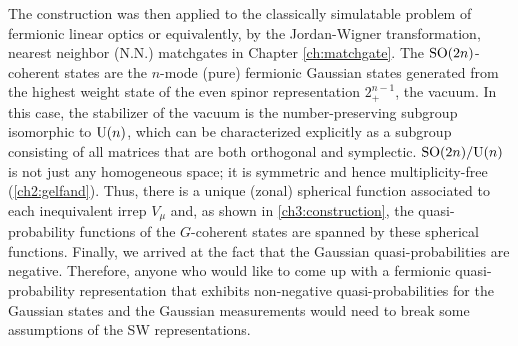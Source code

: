 The construction was then applied to the classically simulatable problem of fermionic linear optics or equivalently, by the Jordan-Wigner transformation, nearest neighbor (N.N.) matchgates in Chapter \ref{ch:matchgate}. The $\text{SO}(2n)$-coherent states are the $n$-mode (pure) fer\-mi\-on\-ic Gaussian states generated from the highest weight state of the even spinor representation $2^{n-1}_+$, the vacuum. In this case, the stabilizer of the vacuum is the number-preserving subgroup isomorphic to $\text{U}(n)$, which can be characterized explicitly as a subgroup consisting of all matrices that are both orthogonal and symplectic. $\text{SO}(2n)/\text{U}(n)$ is not just any homogeneous space; it is symmetric and hence multiplicity-free (\autoref{ch2:gelfand}). Thus, there is a unique (zonal) spherical function associated to each inequivalent irrep $V_{\mu}$ and, as shown in \autoref{ch3:construction}, the quasi-probability functions of the $G$-coherent states are spanned by these spherical functions. Finally, we arrived at the fact that the Gaussian quasi-probabilities are negative. Therefore, anyone who would like to come up with a fermionic quasi-probability representation that exhibits non-negative quasi-probabilities for the Gaussian states and the Gaussian measurements would need to break some assumptions of the SW representations.

